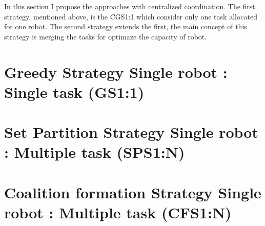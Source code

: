 In this section I propose the approaches with centralized coordination.
The first strategy, mentioned above, is the CGS1:1 which consider only 
one task allocated for one robot.
The second strategy extends the first, the main concept of this strategy 
is merging the tasks for optimaze the capacity of robot.

\section{Greedy Strategy Single robot : Single task (GS1:1)}





\section{Set Partition Strategy Single robot : Multiple task (SPS1:N)}





\section{Coalition formation Strategy Single robot : Multiple task (CFS1:N)}

